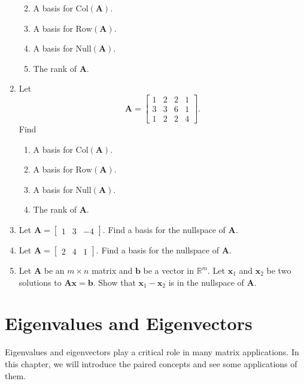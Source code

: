 \documentclass[
]{book}
\providecommand{\tightlist}{%
  \setlength{\itemsep}{0pt}\setlength{\parskip}{0pt}}
\theoremstyle{definition}
\theoremstyle{definition}
\theoremstyle{definition}
\theoremstyle{definition}
\theoremstyle{remark}
\begin{document}
\begin{enumerate}
  \begin{enumerate}
  \def\labelenumii{\alph{enumii}.}
  \tightlist
  \item
    A basis for \(\text{Col}(\mathbf{A}).\)
  \item
    A basis for \(\text{Row}(\mathbf{A}).\)
  \item
    A basis for \(\text{Null}(\mathbf{A}).\)
  \item
    The rank of \(\mathbf{A}.\)
  \end{enumerate}
\item
  Let
  \[\mathbf{A}=\begin{bmatrix}1 & 2 & 2 & 1\\3 & 3 & 6 & 1\\1 & 2 & 2 & 4\end{bmatrix}.\]
  Find

  \begin{enumerate}
  \def\labelenumii{\alph{enumii}.}
  \tightlist
  \item
    A basis for \(\text{Col}(\mathbf{A}).\)
  \item
    A basis for \(\text{Row}(\mathbf{A}).\)
  \item
    A basis for \(\text{Null}(\mathbf{A}).\)
  \item
    The rank of \(\mathbf{A}.\)
  \end{enumerate}
\item
  Let \(\mathbf{A}=\begin{bmatrix} 1 & 3 & -4\end{bmatrix}.\) Find a basis for the nullspace of \(\mathbf{A}.\)
\item
  Let \(\mathbf{A}=\begin{bmatrix} 2 & 4 & 1\end{bmatrix}.\) Find a basis for the nullspace of \(\mathbf{A}.\)
\item
  Let \(\mathbf{A}\) be an \(m\times n\) matrix and \(\mathbf{b}\) be a vector in \(\mathbb{R}^m.\) Let \(\mathbf{x}_1\) and \(\mathbf{x}_2\) be two solutions to \(\mathbf{A}\mathbf{x}=\mathbf{b}.\) Show that \(\mathbf{x}_1-\mathbf{x}_2\) is in the nullspace of \(\mathbf{A}.\)
\end{enumerate}

\chapter{Eigenvalues and Eigenvectors}\label{eigenvalues-and-eigenvectors}

Eigenvalues and eigenvectors play a critical role in many matrix applications. In this chapter, we will introduce the paired concepts and see some applications of them.
\end{document}
